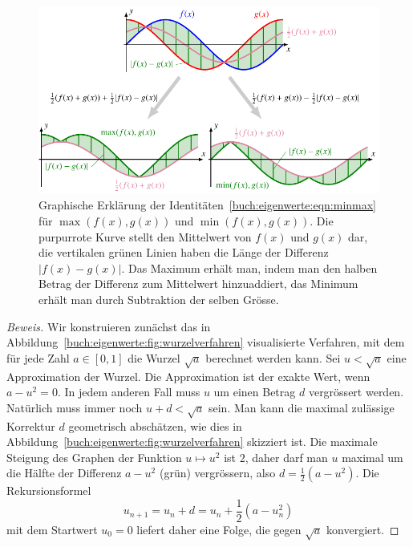 \begin{figure}
\centering
\includegraphics{chapters/40-eigenwerte/images/minmax.pdf}
\caption{Graphische Erklärung der
Identitäten~\eqref{buch:eigenwerte:eqn:minmax} für
$\max(f(x),g(x))$ und $\min(f(x),g(x))$.
Die purpurrote Kurve stellt den Mittelwert von $f(x)$ und $g(x)$ dar,
die vertikalen grünen Linien haben die Länge der Differenz $|f(x)-g(x)|$.
Das Maximum erhält man, indem man den halben Betrag der Differenz zum
Mittelwert hinzuaddiert, das Minimum erhält man durch Subtraktion
der selben Grösse.
\label{buch:eigenwerte:fig:minmax}}
\end{figure}

\begin{proof}[Beweis]
Wir konstruieren zunächst das in
Abbildung~\ref{buch:eigenwerte:fig:wurzelverfahren}
visualisierte Verfahren, mit dem für jede Zahl $a\in[0,1]$
die Wurzel $\sqrt{a}$ berechnet werden kann.
Sei $u < \sqrt{a}$ eine Approximation der Wurzel.
Die Approximation ist der exakte Wert, wenn $a-u^2=0$.
In jedem anderen Fall muss $u$ um einen Betrag $d$ vergrössert werden.
Natürlich muss immer noch $u+d<\sqrt{a}$ sein.
Man kann die maximal zulässige Korrektur $d$ geometrisch abschätzen,
wie dies in Abbildung~\ref{buch:eigenwerte:fig:wurzelverfahren}
skizziert ist.
Die maximale Steigung des Graphen der Funktion $u\mapsto u^2$ ist $2$,
daher darf man $u$ maximal um die Hälfte der Differenz $a-u^2$ (grün)
vergrössern, also $d=\frac12(a-u^2)$.
Die Rekursionsformel
\[
u_{n+1} = u_n + d = u_n + \frac12(a-u_n^2)
\]
mit dem Startwert $u_0=0$ liefert daher eine 
Folge, die gegen $\sqrt{a}$ konvergiert.
\end{proof}


